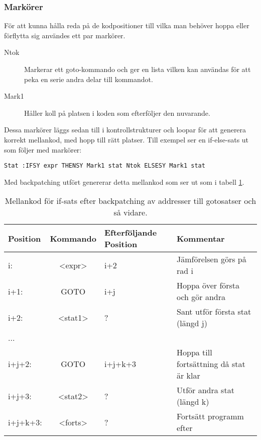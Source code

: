 		\subsubsection{Markörer}
			För att kunna hålla reda på de kodpositioner till vilka man behöver hoppa eller
			förflytta sig användes ett par markörer.

			\begin{description}
				\item[Ntok]	 Markerar ett goto-kommando och ger en lista vilken kan användas för att peka en serie andra delar till kommandot.
				\item[Mark1] Håller koll på platsen i koden som efterföljer den nuvarande.
			\end{description}

			Dessa markörer läggs sedan till i kontrollstrukturer och loopar för att generera korrekt mellankod, med hopp till rätt platser. Till exempel ser en if-else-sats ut som följer med markörer: 
			
\begin{verbatim}
Stat :IFSY expr THENSY Mark1 stat Ntok ELSESY Mark1 stat
\end{verbatim}

			Med backpatching utfört genererar detta mellankod som ser ut som i tabell \ref{Tab:if}.
			
\begin{table}[!htbp]
	\centering
	\begin{tabular}{ l | c | p{} | l }
\textbf{Position} & \textbf{Kommando} & \textbf{Efterföljande Position} & \textbf{Kommentar} \\ \hline
i:  &     <expr>   &  i+2 & Jämförelsen görs på rad i \\
i+1:   &  GOTO    &   i+j &      Hoppa över första och gör andra \\
i+2:   &  <stat1>  &  ? 	&     Sant utför första stat (längd j) \\
... &&&\\
i+j+2:  & GOTO    &   i+j+k+3  & Hoppa till fortsättning då stat är klar \\
i+j+3:  & <stat2>  &  ?      &   Utför andra stat (längd k) \\
i+j+k+3:& <forts>  &  ?      &   Fortsätt programm efter \\
	\end{tabular}
	\caption{Mellankod för if-sats efter backpatching av addresser till gotosatser och så vidare.}
	\label{Tab:if}
\end{table}
		
